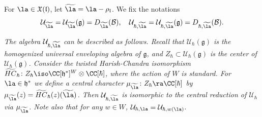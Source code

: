 \documentclass[12pt]{amsart}
\begin{document}
 For $\la \in \mathfrak{X}(\mathfrak{l})$, let $\widetilde{\la}=\la-\rho_{\mathfrak{l}}$. We fix the notations
 \begin{equation*}
     \mathcal{U}_{\widetilde{\la}}=\mathcal{U}_{\widetilde{\la}}(\mathfrak{g})=D_{\widetilde{\la}}(\mathcal{B}), \quad	\mathcal{U}_{\hbar,\widetilde{\la}}=\mathcal{U}_{\hbar,\widetilde{\la}}(\mathfrak{g})=D_{\hbar,\widetilde{\la}}(\mathcal{B}).
 \end{equation*} 



	\begin{rmk}\label{rmk twisting}
	{\emph{The algebra $\mathcal{U}_{\hbar,\widetilde{\la}}$ can be described as follows. Recall that $\mathcal{U}_{\hbar}(\mathfrak{g})$ is the homogenized universal enveloping algebra of $\mathfrak{g}$, and $Z_\hbar \subset \mathcal{U}_{\hbar}(\mathfrak{g})$ is the center of $\mathcal{U}_{\hbar}(\mathfrak{g})$.
	Consider the {\emph{twisted}} Harish-Chandra isomorphism $\widetilde{HC}_{\hbar}\colon Z_\hbar \iso \CC[\mathfrak{h}^*]^{W} \otimes \CC[\hbar]$, where the action of $W$ is {\emph{standard}}.
	For $\la \in \mathfrak{h}^*$
	we define a central character $\mu_{\widetilde{\la}}\colon Z_{\hbar} \ra \CC[\hbar]$ by $\mu_{\widetilde{\la}}(z)=\widetilde{HC}_{\hbar}(z)(\widetilde{\la})$.
	Then $\mathcal{U}_{\hbar,\widetilde{\la}}$ is isomorphic to the central reduction of $\mathcal{U}_\hbar$ via $\mu_{\widetilde{\la}}$.
	Note also that for any $w \in W$, $\mathcal{U}_{\hbar,\la}=\mathcal{U}_{\hbar, w(\la)}$}}. 
	\end{rmk}



\end{document}
